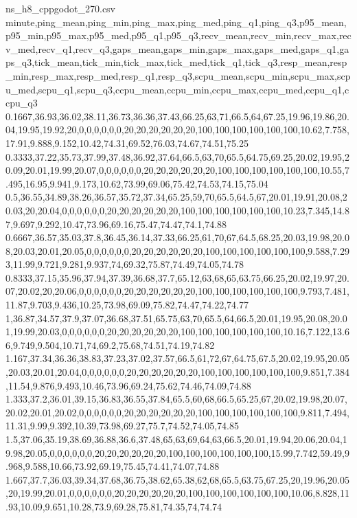 \begin{filecontents*}[overwrite]{ns_h8_cppgodot_270.csv}
minute,ping_mean,ping_min,ping_max,ping_med,ping_q1,ping_q3,p95_mean,p95_min,p95_max,p95_med,p95_q1,p95_q3,recv_mean,recv_min,recv_max,recv_med,recv_q1,recv_q3,gaps_mean,gaps_min,gaps_max,gaps_med,gaps_q1,gaps_q3,tick_mean,tick_min,tick_max,tick_med,tick_q1,tick_q3,resp_mean,resp_min,resp_max,resp_med,resp_q1,resp_q3,scpu_mean,scpu_min,scpu_max,scpu_med,scpu_q1,scpu_q3,ccpu_mean,ccpu_min,ccpu_max,ccpu_med,ccpu_q1,ccpu_q3
0.1667,36.93,36.02,38.11,36.73,36.36,37.43,66.25,63,71,66.5,64,67.25,19.96,19.86,20.04,19.95,19.92,20,0,0,0,0,0,0,20,20,20,20,20,20,100,100,100,100,100,100,10.62,7.758,17.91,9.888,9.152,10.42,74.31,69.52,76.03,74.67,74.51,75.25
0.3333,37.22,35.73,37.99,37.48,36.92,37.64,66.5,63,70,65.5,64.75,69.25,20.02,19.95,20.09,20.01,19.99,20.07,0,0,0,0,0,0,20,20,20,20,20,20,100,100,100,100,100,100,10.55,7.495,16.95,9.941,9.173,10.62,73.99,69.06,75.42,74.53,74.15,75.04
0.5,36.55,34.89,38.26,36.57,35.72,37.34,65.25,59,70,65.5,64.5,67,20.01,19.91,20.08,20.03,20,20.04,0,0,0,0,0,0,20,20,20,20,20,20,100,100,100,100,100,100,10.23,7.345,14.87,9.697,9.292,10.47,73.96,69.16,75.47,74.47,74.1,74.88
0.6667,36.57,35.03,37.8,36.45,36.14,37.33,66.25,61,70,67,64.5,68.25,20.03,19.98,20.08,20.03,20.01,20.05,0,0,0,0,0,0,20,20,20,20,20,20,100,100,100,100,100,100,9.588,7.293,11.99,9.721,9.281,9.937,74,69.32,75.87,74.49,74.05,74.78
0.8333,37.15,35.96,37.94,37.39,36.68,37.7,65.12,63,68,65,63.75,66.25,20.02,19.97,20.07,20.02,20,20.06,0,0,0,0,0,0,20,20,20,20,20,20,100,100,100,100,100,100,9.793,7.481,11.87,9.703,9.436,10.25,73.98,69.09,75.82,74.47,74.22,74.77
1,36.87,34.57,37.9,37.07,36.68,37.51,65.75,63,70,65.5,64,66.5,20.01,19.95,20.08,20.01,19.99,20.03,0,0,0,0,0,0,20,20,20,20,20,20,100,100,100,100,100,100,10.16,7.122,13.66,9.749,9.504,10.71,74,69.2,75.68,74.51,74.19,74.82
1.167,37.34,36.36,38.83,37.23,37.02,37.57,66.5,61,72,67,64.75,67.5,20.02,19.95,20.05,20.03,20.01,20.04,0,0,0,0,0,0,20,20,20,20,20,20,100,100,100,100,100,100,9.851,7.384,11.54,9.876,9.493,10.46,73.96,69.24,75.62,74.46,74.09,74.88
1.333,37.2,36.01,39.15,36.83,36.55,37.84,65.5,60,68,66.5,65.25,67,20.02,19.98,20.07,20.02,20.01,20.02,0,0,0,0,0,0,20,20,20,20,20,20,100,100,100,100,100,100,9.811,7.494,11.31,9.99,9.392,10.39,73.98,69.27,75.7,74.52,74.05,74.85
1.5,37.06,35.19,38.69,36.88,36.6,37.48,65,63,69,64,63,66.5,20.01,19.94,20.06,20.04,19.98,20.05,0,0,0,0,0,0,20,20,20,20,20,20,100,100,100,100,100,100,15.99,7.742,59.49,9.968,9.588,10.66,73.92,69.19,75.45,74.41,74.07,74.88
1.667,37.7,36.03,39.34,37.68,36.75,38.62,65.38,62,68,65.5,63.75,67.25,20,19.96,20.05,20,19.99,20.01,0,0,0,0,0,0,20,20,20,20,20,20,100,100,100,100,100,100,10.06,8.828,11.93,10.09,9.651,10.28,73.9,69.28,75.81,74.35,74,74.74

\end{filecontents*}
